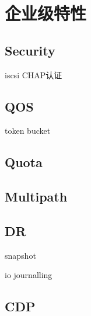 \chapter{企业级特性}

\section{Security}

iscsi CHAP认证

\section{QOS}

token bucket



\section{Quota}

\section{Multipath}

\section{DR}

snapshot

io journalling

\section{CDP}

